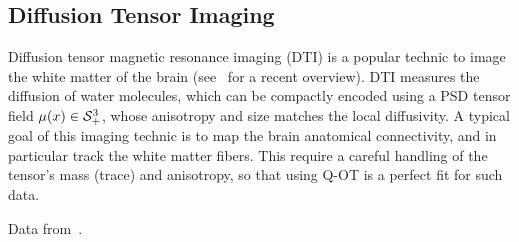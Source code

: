 

\subsection{Diffusion Tensor Imaging}

Diffusion tensor magnetic resonance imaging (DTI) is a popular technic to image the white matter of the brain (see~\cite{wandell2016clarifying} for a recent overview). DTI measures the diffusion of water molecules, which can be compactly encoded using a PSD tensor field $\mu(x) \in \mathcal{S}_+^3$, whose anisotropy and size matches the local diffusivity. 
%
A typical goal of this imaging technic is to map the brain anatomical connectivity, and in particular track the  white matter fibers. This require a careful handling of the tensor's mass (trace) and anisotropy, so that using Q-OT is a perfect fit for such data.

Data from~\cite{CaiafaPestilli}.